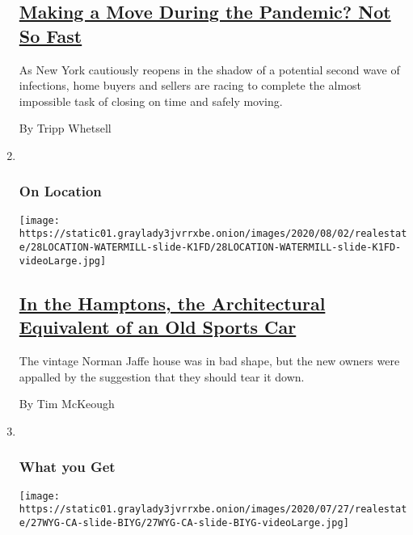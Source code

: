 \begin{enumerate}
  \hypertarget{making-a-move-during-the-pandemic-not-so-fast}{%
  \subsection{\texorpdfstring{\href{/2020/07/28/realestate/buying-selling-moving-during-coronavirus.html}{Making
  a Move During the Pandemic? Not So
  Fast}}{Making a Move During the Pandemic? Not So Fast}}\label{making-a-move-during-the-pandemic-not-so-fast}}

  As New York cautiously reopens in the shadow of a potential second
  wave of infections, home buyers and sellers are racing to complete the
  almost impossible task of closing on time and safely moving.

  By Tripp Whetsell
\item ~
  \hypertarget{on-location}{%
  \subsubsection{On Location}\label{on-location}}

  \texttt{[image: https://static01.graylady3jvrrxbe.onion/images/2020/08/02/realestate/28LOCATION-WATERMILL-slide-K1FD/28LOCATION-WATERMILL-slide-K1FD-videoLarge.jpg]}

  \hypertarget{in-the-hamptons-the-architectural-equivalent-of-an-old-sports-car}{%
  \subsection{\texorpdfstring{\href{/2020/07/28/realestate/in-the-hamptons-the-architectural-equivalent-of-an-old-sports-car.html}{In
  the Hamptons, the Architectural Equivalent of an Old Sports
  Car}}{In the Hamptons, the Architectural Equivalent of an Old Sports Car}}\label{in-the-hamptons-the-architectural-equivalent-of-an-old-sports-car}}

  The vintage Norman Jaffe house was in bad shape, but the new owners
  were appalled by the suggestion that they should tear it down.

  By Tim McKeough
\item ~
  \hypertarget{what-you-get-1}{%
  \subsubsection{What you Get}\label{what-you-get-1}}

  \texttt{[image: https://static01.graylady3jvrrxbe.onion/images/2020/07/27/realestate/27WYG-CA-slide-BIYG/27WYG-CA-slide-BIYG-videoLarge.jpg]}


\end{enumerate}
